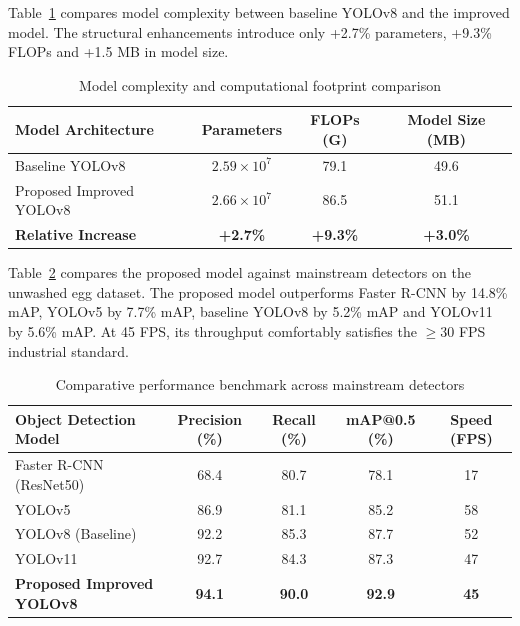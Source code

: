 \documentclass[12pt,a4paper]{report}
\begin{document}
Table~\ref{tab:model_complexity} compares model complexity between baseline YOLOv8 and the improved model. The structural enhancements introduce only +2.7\% parameters, +9.3\% FLOPs and +1.5 MB in model size.

\begin{table}[H]
\centering
\caption{Model complexity and computational footprint comparison}
\label{tab:model_complexity}
\vspace{0.2cm}
\setlength{\tabcolsep}{10pt}
\renewcommand{\arraystretch}{1.15}
\small
\begin{tabular}{lccc}
\toprule
\textbf{Model Architecture} & \textbf{Parameters} & \textbf{FLOPs (G)} & \textbf{Model Size (MB)} \\
\midrule
Baseline YOLOv8 & $2.59 \times 10^7$ & 79.1 & 49.6 \\
Proposed Improved YOLOv8 & $2.66 \times 10^7$ & 86.5 & 51.1 \\
\midrule
\textbf{Relative Increase} & \textbf{+2.7\%} & \textbf{+9.3\%} & \textbf{+3.0\%} \\
\bottomrule
\end{tabular}
\end{table}

Table~\ref{tab:benchmark_comparison} compares the proposed model against mainstream detectors on the unwashed egg dataset. The proposed model outperforms Faster R-CNN by 14.8\% mAP, YOLOv5 by 7.7\% mAP, baseline YOLOv8 by 5.2\% mAP and YOLOv11 by 5.6\% mAP. At 45 FPS, its throughput comfortably satisfies the $\ge 30$ FPS industrial standard.

\begin{table}[H]
\centering
\caption{Comparative performance benchmark across mainstream detectors}
\label{tab:benchmark_comparison}
\vspace{0.2cm}
\setlength{\tabcolsep}{8pt}
\renewcommand{\arraystretch}{1.15}
\small
\begin{tabular}{lcccc}
\toprule
\textbf{Object Detection Model} & \textbf{Precision (\%)} & \textbf{Recall (\%)} & \textbf{mAP@0.5 (\%)} & \textbf{Speed (FPS)} \\
\midrule
Faster R-CNN (ResNet50) & 68.4 & 80.7 & 78.1 & 17 \\
YOLOv5 & 86.9 & 81.1 & 85.2 & 58 \\
YOLOv8 (Baseline) & 92.2 & 85.3 & 87.7 & 52 \\
YOLOv11 & 92.7 & 84.3 & 87.3 & 47 \\
\textbf{Proposed Improved YOLOv8} & \textbf{94.1} & \textbf{90.0} & \textbf{92.9} & \textbf{45} \\
\bottomrule
\end{tabular}
\end{table}
\end{document}
